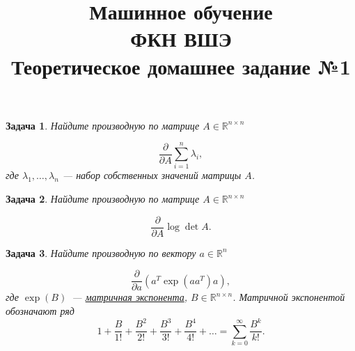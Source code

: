 \documentclass[12pt,fleqn]{article}
\newtheorem{esProblem}{Задача}
\begin{document}
\title{Машинное обучение\\ФКН ВШЭ\\Теоретическое домашнее задание №1}

\date{}

\author{}

\maketitle


\begin{esProblem}
    Найдите производную по матрице $A \in \mathbb{R}^{n\times n}$

    \begin{equation*}
        \frac{\partial}{\partial A} \sum_{i=1}^n \lambda_i,
    \end{equation*}
    где $\lambda_1, \dots, \lambda_n$ --- набор собственных значений матрицы $A$.
\end{esProblem}

\begin{esProblem}
    Найдите производную по матрице $A \in \mathbb{R}^{n\times n}$

    \begin{equation*}
        \frac{\partial}{\partial A} \log \det A.
    \end{equation*}
\end{esProblem}

\begin{esProblem}

    Найдите производную по вектору $a \in \mathbb{R}^{n}$

    \begin{equation*}
        \frac{\partial}{\partial a} \left(
            a^T \exp(a a^T)a
        \right),
    \end{equation*}
    где $\exp(B)$~--- \href{https://en.wikipedia.org/wiki/Matrix_exponential}{матричная экспонента},
    $B \in \mathbb{R}^{n \times n}$.
    Матричной экспонентой обозначают ряд
    \begin{equation*}
        1 + \frac{B}{1!} + \frac{B^2}{2!} + \frac{B^3}{3!} + \frac{B^4}{4!} + \ldots = \sum_{k=0}^\infty \frac{B^k}{k!} .
    \end{equation*}
\end{esProblem}
\end{document}
